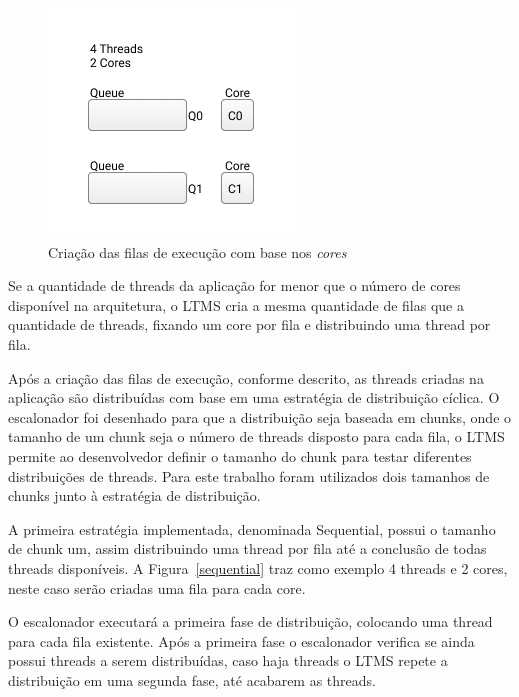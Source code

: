 \documentclass[diss,capa]{texufpel}
\begin{document}
\begin{figure}[htbp]
\centering
\includegraphics[scale=.65]{images/Queue_core.png}
\caption{Criação das filas de execução com base nos \emph{cores}}
\label{queue_core}
\end{figure}

Se a quantidade de threads da aplicação for menor que o número de cores disponível na arquitetura, o LTMS cria a mesma quantidade de filas que a quantidade de threads, fixando um core por fila e distribuindo uma thread por fila.


Após a criação das filas de execução, conforme descrito, as threads criadas na aplicação são distribuídas com base em uma estratégia de distribuição cíclica. O escalonador foi desenhado para que a distribuição seja baseada em chunks, onde o tamanho de um chunk seja o número de threads disposto para cada fila, o LTMS permite ao desenvolvedor definir o tamanho do chunk para testar diferentes distribuições de threads. Para este trabalho foram utilizados dois tamanhos de chunks junto à estratégia de distribuição.

A primeira estratégia implementada, denominada Sequential, possui o tamanho de chunk um, assim distribuindo uma thread por fila até a conclusão de todas threads disponíveis. A Figura~\ref{sequential} traz como exemplo 4 threads e 2 cores, neste caso serão criadas uma fila para cada core.

O escalonador executará a primeira fase de distribuição, colocando uma thread para cada fila existente. Após a primeira fase o escalonador verifica se ainda possui threads a serem distribuídas, caso haja threads o LTMS repete a distribuição em uma segunda fase, até acabarem as threads.
\end{document}
